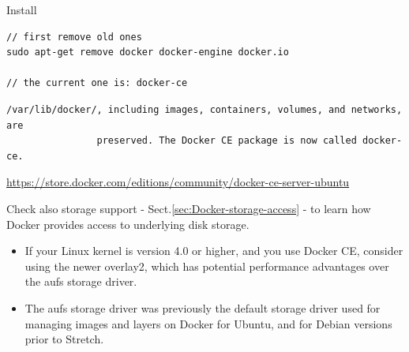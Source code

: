 Install
\begin{verbatim}
// first remove old ones
sudo apt-get remove docker docker-engine docker.io

// the current one is: docker-ce
\end{verbatim}


\begin{verbatim}
/var/lib/docker/, including images, containers, volumes, and networks, are
                preserved. The Docker CE package is now called docker-ce.
\end{verbatim}
\url{https://store.docker.com/editions/community/docker-ce-server-ubuntu}


Check also storage support - Sect.\ref{sec:Docker-storage-access} - to learn how Docker 
provides access to underlying disk storage.

\begin{itemize}
  
  \item If your Linux kernel is version 4.0 or higher, and you use Docker CE,
  consider using the newer overlay2, which has potential performance advantages
  over the aufs storage driver.
  
  \item  The aufs storage driver was previously the default storage driver used
  for managing images and layers on Docker for Ubuntu, and for Debian versions
  prior to Stretch. 
\end{itemize}

